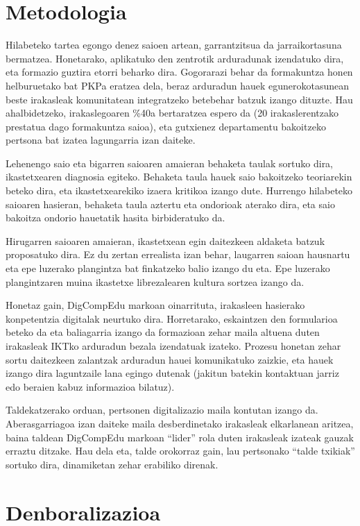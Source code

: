 \section{Metodologia}

Hilabeteko tartea egongo denez saioen artean, garrantzitsua da jarraikortasuna bermatzea. Honetarako, aplikatuko den zentrotik arduradunak izendatuko dira, eta formazio guztira etorri beharko dira. Gogorarazi behar da formakuntza honen helburuetako bat PKPa eratzea dela, beraz arduradun hauek egunerokotasunean beste irakasleak komunitatean integratzeko betebehar batzuk izango dituzte. Hau ahalbidetzeko, irakaslegoaren \%40a bertaratzea espero da (20 irakaslerentzako prestatua dago formakuntza saioa), eta gutxienez departamentu bakoitzeko pertsona bat izatea lagungarria izan daiteke.

Lehenengo saio eta bigarren saioaren amaieran behaketa taulak sortuko dira, ikastetxearen diagnosia egiteko. Behaketa taula hauek saio bakoitzeko teoriarekin beteko dira, eta ikastetxearekiko izaera kritikoa izango dute. Hurrengo hilabeteko saioaren hasieran, behaketa taula aztertu eta ondorioak aterako dira, eta saio bakoitza ondorio hauetatik hasita birbideratuko da.

Hirugarren saioaren amaieran, ikastetxean egin daitezkeen aldaketa batzuk proposatuko dira. Ez du zertan errealista izan behar, laugarren saioan hausnartu eta epe luzerako plangintza bat finkatzeko balio izango du eta. Epe luzerako plangintzaren muina ikastetxe librezalearen kultura sortzea izango da.

Honetaz gain, DigCompEdu markoan oinarrituta, irakasleen hasierako konpetentzia digitalak neurtuko dira. Horretarako, eskaintzen den formularioa beteko da eta baliagarria izango da formazioan zehar maila altuena duten irakasleak IKTko arduradun bezala izendatuak izateko. Prozesu honetan zehar sortu daitezkeen zalantzak arduradun hauei komunikatuko zaizkie, eta hauek izango dira laguntzaile lana egingo dutenak (jakitun batekin kontaktuan jarriz edo beraien kabuz informazioa bilatuz).

Taldekatzerako orduan, pertsonen digitalizazio maila kontutan izango da. Aberasgarriagoa izan daiteke maila desberdinetako irakasleak elkarlanean aritzea, baina taldean DigCompEdu markoan “lider” rola duten irakasleak izateak gauzak erraztu ditzake. Hau dela eta, talde orokorraz gain, lau pertsonako “talde txikiak” sortuko dira, dinamiketan zehar erabiliko direnak.

\section{Denboralizazioa}

